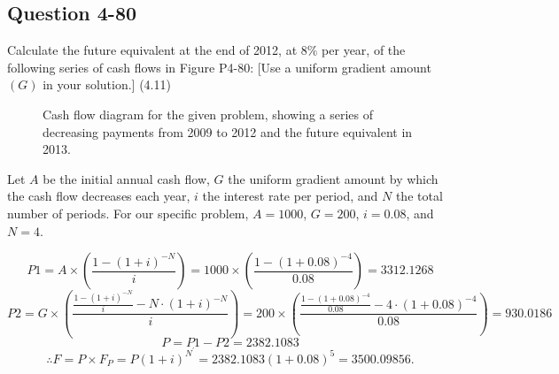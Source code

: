 \documentclass[12pt]{article}
\begin{document}
\newpage
\subsection*{Question 4-80}
\begin{q}
Calculate the future equivalent at the end of 2012, at \(8 \%\) per year, of the following series of cash flows in Figure P4-80: [Use a uniform gradient amount \((G)\) in your solution.] (4.11)
\end{q}

\begin{figure}[!ht]
    \centering
    \caption{Cash flow diagram for the given problem, showing a series of decreasing payments from 2009 to 2012 and the future equivalent in 2013.}
    \label{fig:cash-flow}
\end{figure}

Let \( A \) be the initial annual cash flow, \( G \) the uniform gradient amount by which the cash flow decreases each year, \( i \) the interest rate per period, and \( N \) the total number of periods. For our specific problem, \( A = 1000 \), \( G = 200 \), \( i = 0.08 \), and \( N = 4 \).

\[ P1 = A \times \left(\frac{1 - (1 + i)^{-N}}{i}\right) = 1000 \times \left(\frac{1 - (1 + 0.08)^{-4}}{0.08}\right) = 3312.1268 \]
\[ P2 = G \times \left(\frac{\frac{1 - (1 + i)^{-N}}{i} - N \cdot (1 + i)^{-N}}{i}\right) = 200 \times \left(\frac{\frac{1 - (1 + 0.08)^{-4}}{0.08} - 4 \cdot (1 + 0.08)^{-4}}{0.08}\right) = 930.0186\]
\[P=P1 - P2 = 2382.1083 \]
\[\therefore F = P\times F_P = P (1 + i)^{N^\prime} = 2382.1083 (1+0.08)^5 =\boxed{3500.09856}. \]
\end{document}
